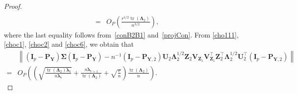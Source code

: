 \documentclass[12pt]{article} %
\DeclareMathOperator{\mytr}{tr}
\newcommand{\bZ}{\mathbf{Z}}
\newcommand{\bP}{\mathbf{P}}
\newcommand{\bY}{\mathbf{Y}}
\newcommand{\bI}{\mathbf{I}}
\newcommand{\bU}{\mathbf{U}}
\newcommand{\bV}{\mathbf{V}}
\newcommand{\bfsym}[1]{\ensuremath{\boldsymbol{#1}}}
\def\blambda {\bfsym {\lambda}}
\def\bLambda {\bfsym {\Lambda}}
\def\bSigma {\bfsym {\Sigma}}
\theoremstyle{definition}
\begin{document}
\begin{appendices}
\begin{proof}
\begin{equation}
\begin{split}
                  \\
                  =&
                  O_P\left(\frac{r^{1/2}\mytr(\bLambda_2)}{n^{3/2}}\right),
     \end{split}
 \end{equation}
where the last equality follows from~\eqref{conB2B1} and~\eqref{projCon}.
From \eqref{cho111}, \eqref{choc1}, \eqref{choc2} and \eqref{choc6}, we obtain that
         \begin{equation*}
             \begin{split}
             &\left\|
             (\bI_p -\bP_\bY)\bSigma (\bI_p- \bP_{\bY})
             -
             n^{-1}
             (\bI_p -\bP_{\bY,2})
              \bU_2 \bLambda_2^{1/2} \bZ_2 \bV_{\bZ_1} \bV_{\bZ_1}^\top \bZ_2^\top \bLambda_2^{1/2} \bU_2^\top
             (\bI_p- \bP_{\bY,2})
             \right\|
             \\
             =&
             O_P\left(
                 \left(
                     \sqrt{\frac{\mytr(\bLambda_2)\blambda_1}{n\blambda_r}}  
                     +\frac{n\blambda_{r+1}}{\mytr(\bLambda_2)}
                     +\sqrt{\frac{r}{n}}
                 \right)
             \frac{\mytr(\bLambda_2)}{n}\right).
             \end{split}
         \end{equation*}


\end{proof}
\end{appendices}
\end{document}
